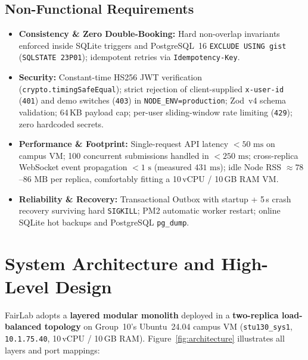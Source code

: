 \documentclass[manuscript,screen,review]{acmart}
\begin{document}
\subsection{Non-Functional Requirements}
\begin{itemize}
  \item \textbf{Consistency \& Zero Double-Booking:} Hard non-overlap invariants enforced inside SQLite triggers and PostgreSQL~16 \texttt{EXCLUDE USING gist} (\texttt{SQLSTATE 23P01}); idempotent retries via \texttt{Idempotency-Key}.
  \item \textbf{Security:} Constant-time HS256 JWT verification (\texttt{crypto.timingSafeEqual}); strict rejection of client-supplied \texttt{x-user-id} (\texttt{401}) and demo switches (\texttt{403}) in \texttt{NODE\_ENV=production}; Zod~v4 schema validation; 64\,KB payload cap; per-user sliding-window rate limiting (\texttt{429}); zero hardcoded secrets.
  \item \textbf{Performance \& Footprint:} Single-request API latency $<50\text{ ms}$ on campus VM; 100 concurrent submissions handled in $<250\text{ ms}$; cross-replica WebSocket event propagation $<1\text{ s}$ (measured $431\text{ ms}$); idle Node RSS $\approx 78$--$86\text{ MB}$ per replica, comfortably fitting a 10\,vCPU / 10\,GB RAM VM.
  \item \textbf{Reliability \& Recovery:} Transactional Outbox with startup + 5\,s crash recovery surviving hard \texttt{SIGKILL}; PM2 automatic worker restart; online SQLite hot backups and PostgreSQL \texttt{pg\_dump}.
\end{itemize}

\section{System Architecture and High-Level Design}
\label{sec:architecture}
FairLab adopts a \textbf{layered modular monolith} deployed in a \textbf{two-replica load-balanced topology} on Group~10's Ubuntu~24.04 campus VM (\texttt{stu130\_sys1}, \texttt{10.1.75.40}, 10\,vCPU / 10\,GB RAM). Figure~\ref{fig:architecture} illustrates all layers and port mappings:
\end{document}
